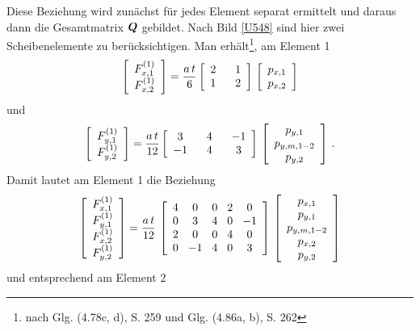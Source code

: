 Diese Beziehung wird zun\"{a}chst f\"{u}r jedes Element separat ermittelt und daraus dann die Gesamtmatrix $\mbox{\boldmath $Q$} $ gebildet. Nach Bild \ref{U548} sind hier zwei Scheibenelemente zu ber\"{u}cksichtigen. Man erh\"{a}lt\footnote{nach \cite{Werkle2} Glg. (4.78c, d), S. 259 und Glg. (4.86a, b), S. 262}, am Element 1
\begin{align}
\left[\barr{c} F_{x,1}^{(1)} \\ F_{x,2}^{(1)} \earr \right] =
\frac{a\,t}{6} \left[\barr{c @{\hspace{6mm}} c} 2 & 1 \\ 1 &2  \earr \right]\,\left[\barr{c} p_{x,1}\\ p_{x,2} \earr \right]
\end{align}
und
\begin{align}
\left[\barr{c} F_{y,1}^{(1)} \\ F_{y,2}^{(1)} \earr \right] =
\frac{a\,t}{12} \left[\barr{c @{\hspace{6mm}} c @{\hspace{6mm}} c} 3 & 4 &-1 \\ -1 &4 &3  \earr \right]\,\left[\barr{c} p_{y,1} \\ p_{y,m,1-2} \\ p_{y,2} \earr \right]\,.
\end{align}
Damit lautet am Element 1 die Beziehung
\begin{align}
\left[\barr{c} F_{x,1}^{(1)} \\ F_{y,1}^{(1)} \\ F_{x,2}^{(1)} \\ F_{y,2}^{(1)}\earr \right]
= \frac{ a\,t}{12}\,\left[\barr{c @{\hspace{3mm}} c @{\hspace{3mm}} c @{\hspace{3mm}} c @{\hspace{3mm}} c} 4 & 0 & 0 &2 & 0 \\ 0 & 3 & 4 &0 & -1\\  2 & 0 & 0 &4 & 0 \\
 0 & -1 & 4 &0 & 3  \earr \right]\,\left[\barr{c} p_{x,1} \\ p_{y,1} \\ p_{y,m,1-2} \\ p_{x,2} \\ p_{y,2} \earr \right]
\end{align}
und entsprechend am Element 2
